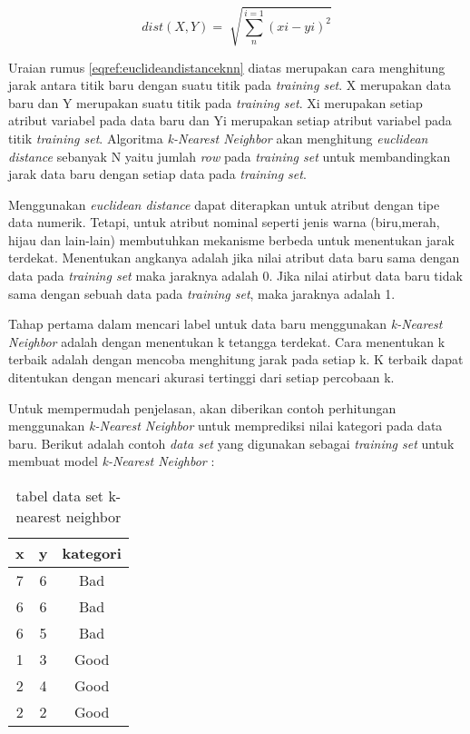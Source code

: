 \begin{equation}
	dist(X,Y) = \sqrt[]{\sum_{n}^{i=1}(xi-yi)^2}
	\label{eqref:euclideandistanceknn}
\end{equation}

Uraian rumus \eqref{eqref:euclideandistanceknn} diatas merupakan cara menghitung jarak antara titik baru dengan suatu titik pada \textit{training set}. X merupakan data baru dan Y merupakan suatu titik pada \textit{training set}. Xi merupakan setiap atribut variabel pada data baru dan Yi merupakan setiap atribut variabel pada titik \textit{training set}. Algoritma \textit{k-Nearest Neighbor} akan menghitung \textit{euclidean distance} sebanyak N yaitu jumlah \textit{row} pada \textit{training set} untuk membandingkan jarak data baru dengan setiap data pada \textit{training set}. 


Menggunakan \textit{euclidean distance} dapat diterapkan untuk atribut dengan tipe data numerik. Tetapi, untuk atribut nominal seperti jenis warna (biru,merah, hijau dan lain-lain) membutuhkan mekanisme berbeda untuk menentukan jarak terdekat. Menentukan angkanya adalah jika nilai atribut data baru sama dengan data pada \textit{training set} maka jaraknya adalah 0. Jika nilai atirbut data baru tidak sama dengan sebuah data pada \textit{training set}, maka jaraknya adalah 1. 

Tahap pertama dalam mencari label untuk data baru menggunakan \textit{k-Nearest Neighbor} adalah  dengan menentukan k tetangga terdekat. Cara menentukan k terbaik adalah dengan mencoba menghitung jarak pada setiap k. K terbaik dapat ditentukan dengan mencari akurasi tertinggi dari setiap percobaan k.

Untuk mempermudah penjelasan, akan diberikan contoh perhitungan menggunakan \textit{k-Nearest Neighbor} untuk memprediksi nilai kategori pada data baru. Berikut adalah contoh \textit{data set} yang digunakan sebagai \textit{training set} untuk membuat model \textit{k-Nearest Neighbor} : 

\begin{table}[ht]
\centering 

\begin{tabular}{|c|c|c|}
\hline 
x & y & kategori \\ 
\hline 
7 & 6 & Bad \\ 
\hline 
6 & 6 & Bad \\ 
\hline 
6 & 5 & Bad \\ 
\hline 
1 & 3 & Good \\ 
\hline 
2 & 4 & Good \\ 
\hline 
2 & 2 & Good \\ 
\hline 
\end{tabular} 
 \caption{tabel data set k-nearest neighbor}
 \label{tab:datasetknn}
 \end{table}
 
